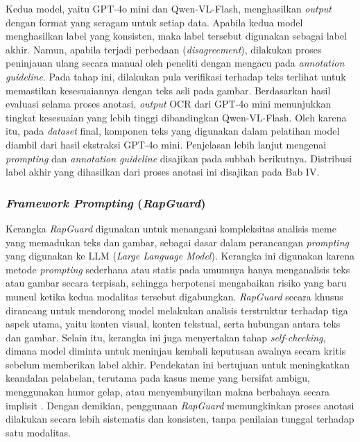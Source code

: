 Kedua model, yaitu GPT-4o mini dan Qwen-VL-Flash, menghasilkan \textit{output} dengan format yang seragam untuk setiap data. Apabila kedua model menghasilkan label yang konsisten, maka label tersebut digunakan sebagai label akhir. Namun, apabila terjadi perbedaan (\textit{disagreement}), dilakukan proses peninjauan ulang secara manual oleh peneliti dengan mengacu pada \textit{annotation guideline}. Pada tahap ini, dilakukan pula verifikasi terhadap teks terlihat untuk memastikan kesesuaiannya dengan teks asli pada gambar. Berdasarkan hasil evaluasi selama proses anotasi, \textit{output} OCR dari GPT-4o mini menunjukkan tingkat kesesuaian yang lebih tinggi dibandingkan Qwen-VL-Flash. Oleh karena itu, pada \textit{dataset} final, komponen teks yang digunakan dalam pelatihan model diambil dari hasil ekstraksi GPT-4o mini. Penjelasan lebih lanjut mengenai \textit{prompting} dan \textit{annotation guideline} disajikan pada subbab berikutnya. Distribusi label akhir yang dihasilkan dari proses anotasi ini disajikan pada Bab IV.

\subsubsection{\textit{Framework Prompting} (\textit{RapGuard})} \label{subsubsec:framework_prompting_rapguard}
Kerangka \textit{RapGuard} digunakan untuk menangani kompleksitas analisis meme yang memadukan teks dan gambar, sebagai dasar dalam perancangan \textit{prompting} yang digunakan ke LLM (\textit{Large Language Model}). Kerangka ini digunakan karena metode \textit{prompting} sederhana atau statis pada umumnya hanya menganalisis teks atau gambar secara terpisah, sehingga berpotensi mengabaikan risiko yang baru muncul ketika kedua modalitas tersebut digabungkan. \textit{RapGuard} secara khusus dirancang untuk mendorong model melakukan analisis terstruktur terhadap tiga aspek utama, yaitu konten visual, konten tekstual, serta hubungan antara teks dan gambar. Selain itu, kerangka ini juga menyertakan tahap \textit{self-checking}, dimana model diminta untuk meninjau kembali keputusan awalnya secara kritis sebelum memberikan label akhir. Pendekatan ini bertujuan untuk meningkatkan keandalan pelabelan, terutama pada kasus meme yang bersifat ambigu, menggunakan humor gelap, atau menyembunyikan makna berbahaya secara implisit \cite{Jiang2024RapGuard}. Dengan demikian, penggunaan \textit{RapGuard} memungkinkan proses anotasi dilakukan secara lebih sistematis dan konsisten, tanpa penilaian tunggal terhadap satu modalitas.


